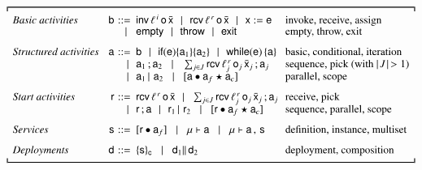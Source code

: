 \begin{table}[t]
\begin{small}
$$
\delimite{
\begin{array}{
@{\hspace{-1ex}}l@{\hspace{2ex}}r@{\hspace{.75ex}}l@{\!}l@{\hspace{1.5ex}}l@{\hspace{-1ex}}}
\textit{Basic activities} & \xa & ::= &
\xinv{\plinv}{\xo}{\bar{\xx}} \!\sepgr\!
\xrec{\plrec}{\xo}{\bar{\xx}} \!\sepgr\!
\xass{\xx}{\xe} & \textrm{invoke, receive, assign}\\[-.05cm]
 &  & \!\sepgr\! &
\xskip \!\sepgr\!
\xthr \!\sepgr\!
\xexit & \textrm{empty, throw, exit}\\[0.25cm]
%
\textit{Structured activities} & \xs & ::= &
\xa \!\sepgr\!
\xif{\xe}{\xs_1}{\xs_2} \!\sepgr\!
\xwhile{\xe}{\xs} & \textrm{basic, conditional, iteration}\\[-.02cm]
& & \sepgr & \xs_1\xsucc\xs_2 \sepgr
\sum_{j \in J}\xrec{\plrec_j}{\xo_j}{\bar{\xx}_j}\recsep\xs_j &
\textrm{sequence, pick (with $\length{J} \,> 1$)}\\[-.05cm] & & \sepgr & \xs_1
\xpar\, \xs_2 \sepgr \xscopefc{\xs}{\xh_f}{\xh_c} & \textrm{parallel, scope}
\\[0.25cm]
%
\textit{Start activities} & \xsa & ::= &
\xrec{\plrec}{\xo}{\bar{\xx}} \!\sepgr\!
\sum_{j\in J}\xrec{\plrec_j}{\xo_j}{\bar{\xx}_j}\recsep\xs_j & \textrm{receive,
pick}\\[-.05cm] & & \sepgr & \xsa \xsucc \xs \!\sepgr\! \xsa_1 \xpar\, \xsa_2
\sepgr \xscopefc{\xsa}{\xh_f}{\xh_c} & \textrm{sequence, parallel,
scope}\\[0.25cm]
%
\textit{Services} & \xI & ::= &
\xproc{\xsa}{\xh_f} \sepgr
\xinst{\xsigma}{\xs} \sepgr
\xinst{\xsigma}{\xs} \xmid \xI & \textrm{definition, instance,
multiset}\\[0.25cm]
%
\textit{Deployments} & \xd & ::= &
\xeng{\xI}{\xcorr} \sepgr
\xd_1 \xspar \xd_2 &  \textrm{deployment, composition}
\end{array}
}
$$
\end{small}
  \vspace*{-1.20cm}
  \caption{La sintassi di Blite}
  \label{tab:syntaxwsbpel}
  \vspace*{-0.3cm}
\end{table}

